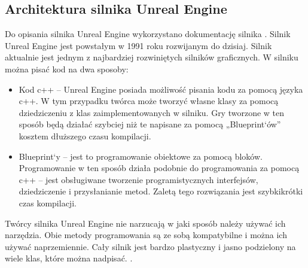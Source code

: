 \documentclass[12pt,twoside]{article}
\begin{document}
\clearpage
\subsection{Architektura silnika Unreal Engine}
Do opisania silnika Unreal Engine wykorzystano dokumentację silnika \cite{UE:Documentatnion}.
Silnik Unreal Engine jest powstałym w 1991 roku rozwijanym do dzisiaj. Silnik
aktualnie jest jednym z najbardziej rozwiniętych silników graficznych. W silniku
można pisać kod na dwa sposoby: 
\begin{itemize}
\item Kod c++ -- Unreal Engine posiada możliwość pisania kodu za pomocą języka
c++. W tym przypadku twórca może tworzyć własne klasy za pomocą dziedziczeniu z
klas zaimplementowanych w silniku. Gry tworzone w ten sposób będą działać
szybciej niż te napisane za pomocą „Blueprint`ów” kosztem dłuższego czasu kompilacji. 
\item Blueprint`y -- jest to programowanie obiektowe za pomocą bloków.
Programowanie w ten sposób działa podobnie do programowania za pomocą c++ -- jest
obsługiwane tworzenie programistycznych interfejsów, dziedziczenie i
przysłanianie metod. Zaletą tego rozwiązania jest szybkikrótki czas kompilacji.
\end{itemize}

Twórcy silnika Unreal Engine nie narzucają w jaki sposób należy używać ich
narzędzia. Obie metody programowania są ze sobą kompatybilne i można ich używać
naprzemiennie. Cały silnik jest bardzo plastyczny i jasno podzielony na wiele
klas, które można nadpisać. \cite{UnrealEngineArchitecture}. 
\end{document}
